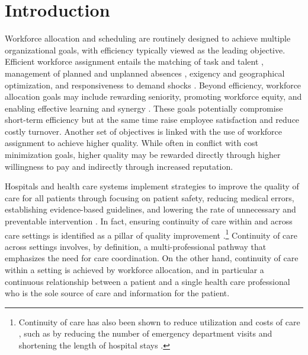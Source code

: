 \documentclass[final,12pt, notitlepage]{article}
\begin{document}
\newpage
\section{Introduction}


Workforce allocation and scheduling are routinely designed to achieve multiple organizational goals, with efficiency typically viewed as the leading objective. Efficient workforce assignment entails the matching of task and talent \citep{Garicano2004}, management of planned and unplanned absences \citep{Ehrenberg1970, Allen1983}, exigency and geographical optimization, and responsiveness to demand shocks \citep{Hamermesh1996}.
Beyond efficiency, workforce allocation goals may include rewarding seniority, promoting workforce equity, and enabling effective learning and synergy \citep{Mas2009}. These goals potentially compromise short-term efficiency but at the same time raise employee satisfaction and reduce costly turnover. Another set of objectives is linked with the use of workforce assignment to achieve higher quality. While often in conflict with cost minimization goals, higher quality may be rewarded directly through higher willingness to pay and indirectly through increased reputation.



Hospitals and health care systems implement strategies to improve the quality of care for all patients through focusing on patient safety, reducing medical errors, establishing evidence-based guidelines, and lowering the rate of unnecessary and preventable intervention \citep{Kozak2001, Makary2016}.
In fact, ensuring continuity of care within and across care settings is identified as a pillar of quality improvement \citep{Richardson2001}.\footnote{Continuity of care has also been shown to reduce utilization and costs of care \citep{Raddish1999}, such as by reducing the number of emergency department visits and shortening the length of hospital stays \citep{Wasson1984}.}
Continuity of care across settings involves, by definition, a multi-professional pathway that emphasizes the need for care coordination. On the other hand, continuity of care within a setting is achieved by workforce allocation, and in particular a continuous relationship between a patient and a single health care professional who is the sole source of care and information for the patient. 
\end{document}
